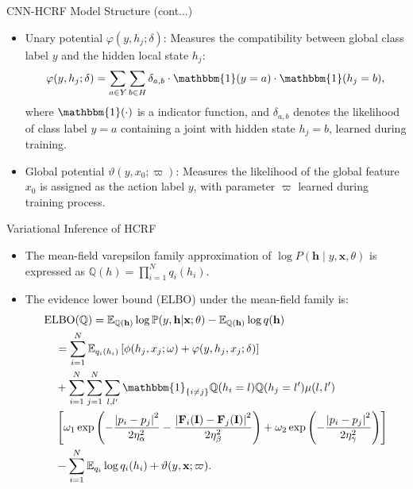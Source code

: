 \documentclass[leqno]{beamer}
\newcommand{\EE}{{\mathbb{E}}}
\newcommand{\PP}{{\mathbb{P}}}
\newcommand{\QQ}{{\mathbb{Q}}}
\newcommand{\Fb}{\mathbf{F}}
\newcommand{\Ib}{\mathbf{I}}
\newcommand{\hb}{\mathbf{h}}
\newcommand{\xb}{\mathbf{x}}
\newcommand{\one}{\mathbbm{1}}
\begin{document}
\begin{frame}{CNN-HCRF Model Structure (cont...)}
\begin{itemize}
\item Unary potential $\varphi(y, h_{j}; \delta)$: Measures the compatibility
between global class label $y$ and the hidden local state $h_j$:
\begin{equation*}
\varphi(y, h_{j}; \delta) = \sum_{a \in Y} \sum_{b \in H} \delta_{a, b}
\cdot \one(y = a) \cdot \one(h_j = b),
\end{equation*}
where $\one(\cdot)$ is a indicator function, and $\delta_{a,b}$ denotes the
likelihood of class label $y = a$ containing a joint with hidden state
$h_j = b$, learned during training.
\item Global potential $\vartheta(y, x_0; \varpi)$: Measures the likelihood of
the global feature $x_0$ is assigned as the action label $y$, with parameter
$\varpi$ learned during training process.
\end{itemize}
\end{frame}


\begin{frame}{Variational Inference of HCRF}
\begin{small}
\begin{itemize}
\item The mean-field varepsilon family approximation of
$\log P(\hb \mid y,\xb,\theta)$ is expressed as
$\QQ(h) = \prod_{i=1}^N q_i(h_i)$.
\item The evidence lower bound (ELBO) under the mean-field family is:
\begin{equation*}
\begin{split}
& \textrm{ELBO}(\QQ) = \EE_{\QQ(\hb)} \log\PP(y, \hb \vert \xb; \theta)
- \EE_{\QQ(\hb)} \log q(\hb) \\
&\quad = \sum_{i=1}^N \EE_{q_i(h_i)}
\left[ \phi(h_j, x_j; \omega) + \varphi(y, h_j, x_j; \delta) \right] \\
&\quad + \sum_{i=1}^N \sum_{j=1}^N \sum_{l,l^\prime} \one_{\{i \neq j\}} 
\QQ(h_i = l) \QQ(h_j = l^\prime) \mu(l, l^\prime) \\
&\quad \left[ \omega_1 \exp \left(
- \frac{\left\lvert p_i - p_j \right\rvert^2}{2\eta_\alpha^2}
- \frac{\left\lvert \Fb_i(\Ib) - \Fb_j(\Ib) \right\rvert^2}{2\eta_\beta^2}
\right) + \omega_2 \exp \left(
- \frac{\left\lvert p_i - p_j \right\rvert^2}{2\eta_\gamma^2}
\right) \right] \\
&\quad - \sum_{i=1}^N \EE_{q_i} \log q_i(h_i) + \vartheta(y, \xb; 
\varpi).
\end{split}
\end{equation*}
\end{itemize}
\end{small}
\end{frame}
\end{document}
